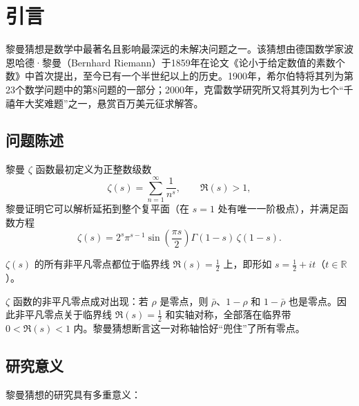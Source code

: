 \section{引言}\label{sec:introduction}

黎曼猜想是数学中最著名且影响最深远的未解决问题之一。该猜想由德国数学家波恩哈德·黎曼（Bernhard Riemann）于1859年在论文《论小于给定数值的素数个数》\cite{riemann1859prime}中首次提出，至今已有一个半世纪以上的历史。1900年，希尔伯特将其列为第23个数学问题中的第8问题的一部分\cite{hilbert1900problems}；2000年，克雷数学研究所又将其列为七个“千禧年大奖难题”之一，悬赏百万美元征求解答。

\subsection{问题陈述}

黎曼 $\zeta$ 函数最初定义为正整数级数
\begin{equation}
    \zeta(s) = \sum_{n=1}^{\infty} \frac{1}{n^s}, \qquad \Re(s) > 1,
\end{equation}
黎曼证明它可以解析延拓到整个复平面（在 $s=1$ 处有唯一一阶极点），并满足函数方程
\begin{equation}
    \zeta(s) = 2^s \pi^{s-1} \sin\!\left(\frac{\pi s}{2}\right) \Gamma(1-s)\, \zeta(1-s).
\end{equation}

\begin{definition}[黎曼猜想]\label{def:RH}
    $\zeta(s)$ 的所有非平凡零点都位于临界线 $\Re(s) = \tfrac{1}{2}$ 上，即形如 $s = \tfrac{1}{2} + it$（$t \in \mathbb{R}$）。
\end{definition}

$\zeta$ 函数的非平凡零点成对出现：若 $\rho$ 是零点，则 $\bar{\rho}$、$1-\rho$ 和 $1-\bar{\rho}$ 也是零点。因此非平凡零点关于临界线 $\Re(s)=\tfrac{1}{2}$ 和实轴对称，全部落在临界带 $0 < \Re(s) < 1$ 内。黎曼猜想断言这一对称轴恰好“兜住”了所有零点。

\subsection{研究意义}

黎曼猜想的研究具有多重意义：


